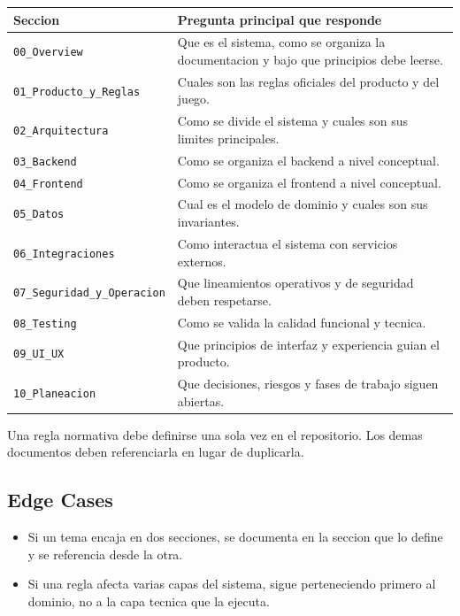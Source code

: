 \begin{longtable}{p{}p{}}
\toprule
\textbf{Seccion} & \textbf{Pregunta principal que responde} \\
\midrule
\texttt{00\_Overview} & Que es el sistema, como se organiza la documentacion y bajo que principios debe leerse. \\
\texttt{01\_Producto\_y\_Reglas} & Cuales son las reglas oficiales del producto y del juego. \\
\texttt{02\_Arquitectura} & Como se divide el sistema y cuales son sus limites principales. \\
\texttt{03\_Backend} & Como se organiza el backend a nivel conceptual. \\
\texttt{04\_Frontend} & Como se organiza el frontend a nivel conceptual. \\
\texttt{05\_Datos} & Cual es el modelo de dominio y cuales son sus invariantes. \\
\texttt{06\_Integraciones} & Como interactua el sistema con servicios externos. \\
\texttt{07\_Seguridad\_y\_Operacion} & Que lineamientos operativos y de seguridad deben respetarse. \\
\texttt{08\_Testing} & Como se valida la calidad funcional y tecnica. \\
\texttt{09\_UI\_UX} & Que principios de interfaz y experiencia guian el producto. \\
\texttt{10\_Planeacion} & Que decisiones, riesgos y fases de trabajo siguen abiertas. \\
\bottomrule
\end{longtable}

Una regla normativa debe definirse una sola vez en el repositorio. Los demas documentos deben referenciarla en lugar de duplicarla.

\subsection{Edge Cases}

\begin{itemize}
  \item Si un tema encaja en dos secciones, se documenta en la seccion que lo define y se referencia desde la otra.
  \item Si una regla afecta varias capas del sistema, sigue perteneciendo primero al dominio, no a la capa tecnica que la ejecuta.
\end{itemize}

